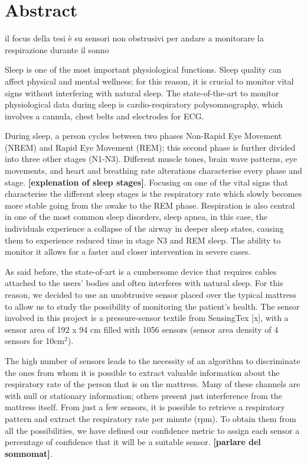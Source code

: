\chapter*{Abstract}


il focus della tesi è su sensori non obstrusivi per andare a monitorare la respirazione durante il sonno



Sleep is one of the most important physiological functions. Sleep quality can affect physical and mental wellness; for this reason,
 it is crucial to monitor vital signs without interfering with natural sleep. 
 The state-of-the-art to monitor physiological data during sleep is cardio-respiratory polysomnography, which involves a cannula, chest belts and electrodes for ECG.

 During sleep, a person cycles between two phases Non-Rapid Eye Movement (NREM) and Rapid Eye Movement (REM); this second phase is further divided into three other stages (N1-N3). Different muscle tones, brain wave patterns, eye movements, and heart and breathing rate alterations characterise every phase and stage.
\textbf{[explenation of sleep stages]}.
Focusing on one of the vital signs that characterise the different sleep stages is the respiratory rate which slowly becomes more stable going from the awake to the REM phase. Respiration is also central in one of the most common sleep disorders, sleep apnea, in this case, the individuals experience a collapse of the airway in deeper sleep states, causing them to experience reduced time in stage N3 and REM sleep. 
The ability to monitor it allows for a faster and closer intervention in severe cases. 

As said before, the state-of-art is a cumbersome device that 
requires cables attached to the users' bodies and often interferes with 
natural sleep. For this reason, we decided to use an unobtrusive sensor 
placed over the typical mattress to allow us to study the possibility of
 monitoring the patient's health. The sensor involved in this project is a 
 pressure-sensor textile from SensingTex [x], with a sensor area of 192 x 94 
 cm filled with 1056 sensors (sensor area density of 4 sensors for 10cm$^2$).

 The high number of sensors leads to the necessity of an algorithm to discriminate the ones from whom it is possible to extract valuable information about the respiratory rate of the person that is on the mattress.
 Many of these channels are with null or stationary information; others present just interference from the mattress itself. From just a few sensors, it is possible to retrieve a respiratory pattern and extract the respiratory rate per minute (rpm). To obtain them from all the possibilities, we have defined our confidence metric to assign each sensor a percentage of confidence that it will be a suitable sensor.
 \textbf{[parlare del somnomat]}.

